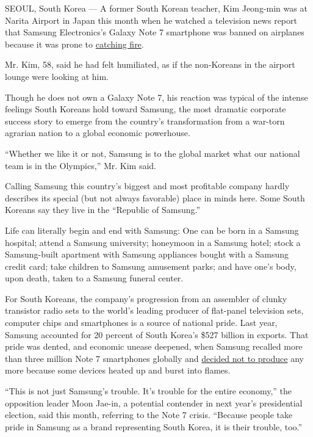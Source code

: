 SEOUL, South Korea --- A former South Korean teacher, Kim Jeong-min was
at Narita Airport in Japan this month when he watched a television news
report that Samsung Electronics's Galaxy Note 7 smartphone was banned on
airplanes because it was prone to
\href{http://www.nytimes.com/2016/09/03/business/samsung-galaxy-note-battery.html?_r=0}{catching
fire}.

Mr. Kim, 58, said he had felt humiliated, as if the non-Koreans in the
airport lounge were looking at him.

Though he does not own a Galaxy Note 7, his reaction was typical of the
intense feelings South Koreans hold toward Samsung, the most dramatic
corporate success story to emerge from the country's transformation from
a war-torn agrarian nation to a global economic powerhouse.

``Whether we like it or not, Samsung is to the global market what our
national team is in the Olympics,'' Mr. Kim said.

Calling Samsung this country's biggest and most profitable company
hardly describes its special (but not always favorable) place in minds
here. Some South Koreans say they live in the ``Republic of Samsung.''

Life can literally begin and end with Samsung: One can be born in a
Samsung hospital; attend a Samsung university; honeymoon in a Samsung
hotel; stock a Samsung-built apartment with Samsung appliances bought
with a Samsung credit card; take children to Samsung amusement parks;
and have one's body, upon death, taken to a Samsung funeral center.

For South Koreans, the company's progression from an assembler of clunky
transistor radio sets to the world's leading producer of flat-panel
television sets, computer chips and smartphones is a source of national
pride. Last year, Samsung accounted for 20 percent of South Korea's
\$527 billion in exports. That pride was dented, and economic unease
deepened, when Samsung recalled more than three million Note 7
smartphones globally and
\href{http://www.nytimes.com/2016/10/12/business/international/samsung-galaxy-note7-terminated.html}{decided
not to produce} any more because some devices heated up and burst into
flames.

``This is not just Samsung's trouble. It's trouble for the entire
economy,'' the opposition leader Moon Jae-in, a potential contender in
next year's presidential election, said this month, referring to the
Note 7 crisis. ``Because people take pride in Samsung as a brand
representing South Korea, it is their trouble, too.''

